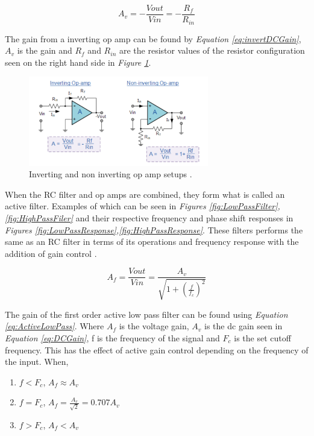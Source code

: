 \begin{equation}
    A_v = -\frac{V{out}}{V{in}} = -\frac{R_f}{R_{in}}
    \label{eq:invertDCGain}
\end{equation}

The gain from a inverting op amp can be found by \textit{Equation \ref{eq:invertDCGain}}, $A_v$ is the gain and $R_f$ and $R_{in}$ are the resistor values of the resistor configuration seen on the right hand side in \textit{Figure \ref{fig:invNonInvOPamp}}.

\begin{figure}[h]
    \centering
    \includegraphics[width=0.70\textwidth]{graphics/invNoninv.png}
    \caption{Inverting and non inverting op amp setups \cite{noauthor_operational_2013}.}
    \label{fig:invNonInvOPamp}
\end{figure}

When the RC filter and op amps are combined, they form what is called an active filter.
Examples of which can be seen in \textit{Figures \ref{fig:LowPassFilter},\ref{fig:HighPassFiler}} and their respective frequency and phase shift responses in \textit{Figures \ref{fig:LowPassResponse},\ref{fig:HighPassResponse}}.
These filters performs the same as an RC filter in terms of its operations and frequency response with the addition of gain control \cite{noauthor_active_2013-1}.


\begin{equation}
    A_f = \frac{V{out}}{V{in}} = \frac{A_v}{\sqrt{1 + (\frac{f}{f_c})^2}}
    \label{eq:ActiveLowPass}
\end{equation}





The gain of the first order active low pass filter can be found using \textit{Equation \ref{eq:ActiveLowPass}}.
Where $A_f$ is the voltage gain, $A_v$ is the dc gain seen in \textit{Equation \ref{eq:DCGain}}, f is the frequency of the signal and $F_c$ is the set cutoff frequency.
This has the effect of active gain control depending on the frequency of the input.
When,
\begin{enumerate}
    \item $f < F_c$, $A_f \approx A_v$
    \item $f = F_c$, $A_f = \frac{A_v}{\sqrt{2}} = 0.707 A_v$
    \item$f > F_c$, $A_f < A_v$
\end{enumerate}

